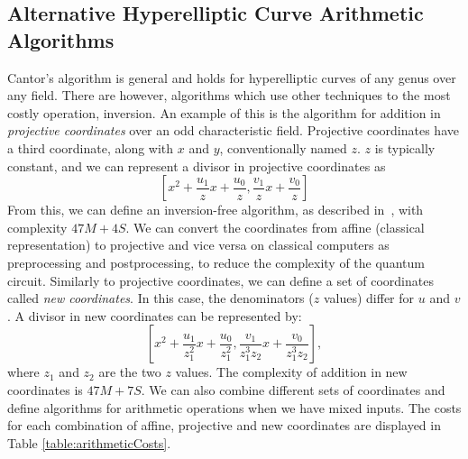 \subsection{Alternative Hyperelliptic Curve Arithmetic Algorithms}
Cantor's algorithm is general and holds for hyperelliptic curves of any genus over any field. There are however, algorithms which use other techniques to the most costly operation, inversion.
An example of this is the algorithm for addition in \emph{projective coordinates} over an odd characteristic field. Projective coordinates have a third coordinate, along with $x$ and $y$, conventionally named $z$. $z$ is typically constant, and we can represent a divisor in projective coordinates as $$[x^2+\frac{u_1}{z}x + \frac{u_0}{z}, \frac{v_1}{z}x + \frac{v_0}{z}]$$ From this, we can define an inversion-free algorithm, as described in~\cite{cohen2005handbook}, with complexity $47M + 4S$. We can convert the coordinates from affine (classical representation) to projective and vice versa on classical computers as preprocessing and postprocessing, to reduce the complexity of the quantum circuit. Similarly to projective coordinates, we can define a set of coordinates called \emph{new coordinates}. In this case, the denominators ($z$ values) differ for $u$ and $v$. A divisor in new coordinates can be represented by: $$[x^2 + \frac{u_1}{z_1^2}x + \frac{u_0}{z_1^2}, \frac{v_1}{z_1^3z_2}x + \frac{v_0}{z_1^3z_2}],$$ where $z_1$ and $z_2$ are the two $z$ values. The complexity of addition in new coordinates is $47M+7S$. We can also combine different sets of coordinates and define algorithms for arithmetic operations when we have mixed inputs. The costs for each combination of affine, projective and new coordinates are displayed in Table \ref{table:arithmeticCosts}. 
